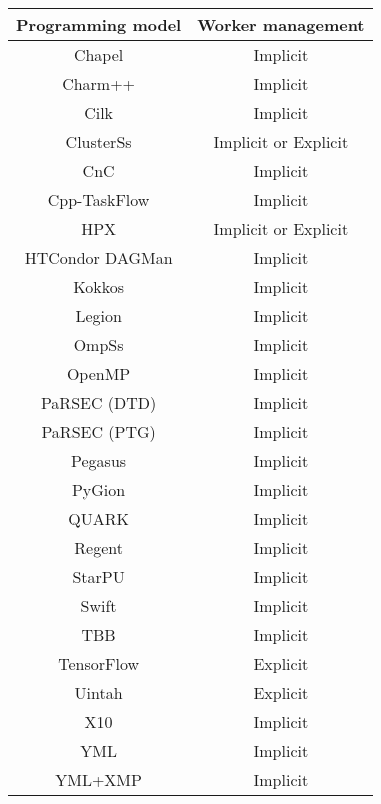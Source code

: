 \begin{tabular}{cc}
\hline
Programming model & Worker management \\
\hline
Chapel & Implicit\\
Charm++ & Implicit\\
Cilk & Implicit\\
ClusterSs & Implicit or Explicit\\
CnC & Implicit\\
Cpp-TaskFlow & Implicit\\
HPX & Implicit or Explicit\\
HTCondor DAGMan & Implicit\\
Kokkos & Implicit\\
Legion & Implicit\\
OmpSs & Implicit\\
OpenMP & Implicit\\
PaRSEC (DTD) & Implicit\\
PaRSEC (PTG) & Implicit\\
Pegasus & Implicit\\
PyGion & Implicit\\
QUARK & Implicit\\
Regent & Implicit\\
StarPU & Implicit\\
Swift & Implicit\\
TBB & Implicit\\
TensorFlow & Explicit\\
Uintah & Explicit\\
X10 & Implicit\\
YML & Implicit\\
YML+XMP & Implicit\\
\hline
\end{tabular}
